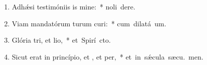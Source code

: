 \begin{flushleft}
\begin{enumerate}[leftmargin=*]
\item Adh\'{\ae}si testimóniis is mine:~* \mbox{noli  dere.}
\item Viam mandatórum turum curi:~* \mbox{cum dilatá  um.}
\item Glória tri, et lio,~* \mbox{et Spirí cto.}
\item Sicut erat in princípio, et , et per,~* \mbox{et in s\'{\ae}cula sæcu. men.}


\end{enumerate}
\end{flushleft}


